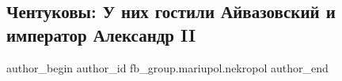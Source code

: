  
 
 
 
 

\subsection{Чентуковы: У них гостили Айвазовский и император Александр II}
\label{sec:15_06_2021.fb.fb_group.mariupol.nekropol.1.chentukovy}

\ifcmt
 author_begin
   author_id fb_group.mariupol.nekropol
 author_end
\fi

